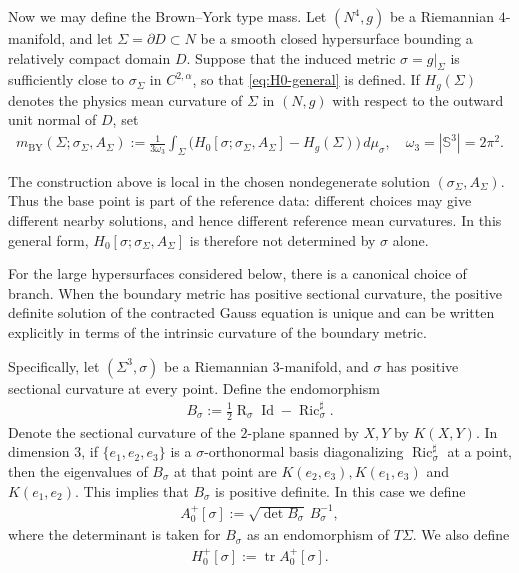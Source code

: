 \documentclass[10pt,a4paper]{amsart}
\newcommand{\Sph}{\mathbb{S}}
\newcommand{\tr}{\operatorname{tr}}
\newcommand{\Ric}{\operatorname{Ric}}
\newcommand{\Id}{\operatorname{Id}}
\newcommand{\Scal}{\operatorname{R}}
\newcommand{\BY}{\mathrm{BY}}
\begin{document}
	Now we may define the Brown--York type mass. Let $(N^4,g)$ be a Riemannian
	$4$-manifold, and let $\Sigma=\partial D\subset N$ be a smooth closed hypersurface
	bounding a relatively compact domain $D$. Suppose that the induced metric
	$\sigma=g|_\Sigma$ is sufficiently close to $\sigma_\Sigma$ in $C^{2,\alpha}$, so
	that \eqref{eq:H0-general} is defined. If $H_g(\Sigma)$ denotes the physics mean curvature of $\Sigma$ in $(N,g)$ with respect to the outward unit normal of $D$, set
	\begin{align}
		m_{\BY}(\Sigma;\sigma_\Sigma,A_\Sigma)
		:=
		\frac{1}{3\omega_3}
		\int_{\Sigma}
		\bigl(
		H_0[\sigma;\sigma_\Sigma,A_\Sigma]
		-
		H_g(\Sigma)
		\bigr)\,d\mu_\sigma,
		\quad
		\omega_3=|\Sph^3|=2\pi^2 .
	\end{align}
	
	\medskip
	
	The construction above is local in the chosen nondegenerate solution
	$(\sigma_\Sigma,A_\Sigma)$. Thus the base point is part of the reference data:
	different choices may give different nearby solutions, and hence different
	reference mean curvatures. In this general form,
	$H_0[\sigma;\sigma_\Sigma,A_\Sigma]$ is therefore not determined by $\sigma$
	alone.
	
	For the large hypersurfaces considered below, there is a canonical choice of
	branch. When the boundary metric has positive sectional curvature, the positive
	definite solution of the contracted Gauss equation is unique and can be written
	explicitly in terms of the intrinsic curvature of the boundary metric.
	
	Specifically, let $(\Sigma^3,\sigma)$ be a Riemannian $3$-manifold, and $\sigma$ has positive sectional curvature at every point. Define the endomorphism
	\begin{align}\label{eq:B-sigma-def}
		B_\sigma
		:=
		\frac12\Scal_\sigma \Id
		-
		\Ric_\sigma^\sharp .
	\end{align}
	Denote the sectional curvature of the $2$-plane spanned by $X,Y$ by $K(X,Y)$. In dimension $3$, if
	$\{e_1,e_2,e_3\}$ is a $\sigma$-orthonormal basis diagonalizing
	$\Ric_\sigma^\sharp$ at a point, then the eigenvalues of $B_\sigma$ at that point are $K(e_2,e_3), K(e_1,e_3)$ and $K(e_1,e_2)$. This implies that $B_\sigma$ is positive definite. In this case we define
	\begin{align}\label{eq:A-plus-def}
		A_0^+[\sigma]
		:=
		\sqrt{\det B_\sigma}\,B_\sigma^{-1},
	\end{align}
	where the determinant is taken for $B_\sigma$ as an endomorphism of $T\Sigma$.
	We also define
	\begin{align}
		H_0^+[\sigma]
		:=
		\tr A_0^+[\sigma].
	\end{align}
	
\end{document}
